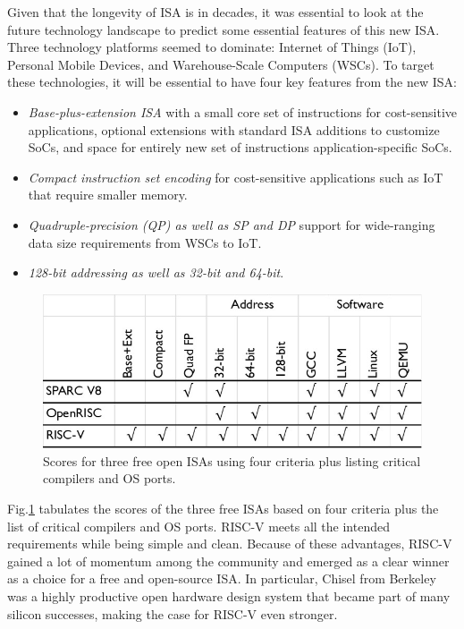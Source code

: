 \documentclass[journal]{IEEEtran}
\begin{document}
Given that the longevity of ISA is in decades, it was essential to look at the future technology landscape to predict some essential features of this new ISA. Three technology platforms seemed to dominate: Internet of Things (IoT), Personal Mobile Devices, and Warehouse-Scale Computers (WSCs). To target these technologies, it will be essential to have four key features from the new ISA:
\begin{itemize}
    \item \textit{Base-plus-extension ISA} with a small core set of instructions for cost-sensitive applications, optional extensions with standard ISA additions to customize SoCs, and space for entirely new set of instructions application-specific SoCs.
    \item \textit{Compact instruction set encoding} for cost-sensitive applications such as IoT that require smaller memory.
    \item \textit{Quadruple-precision (QP) as well as SP and DP} support for wide-ranging data size requirements from WSCs to IoT.
    \item \textit{128-bit addressing as well as 32-bit and 64-bit}.

\end{itemize}

\begin{figure}[htb]
    \centering
    \includegraphics[width=0.95\linewidth]{image-3FreeISA-Table.jpg}
    \caption{Scores for three free open ISAs using four criteria plus listing critical compilers and OS ports.}
    \label{fig:score}
\end{figure}

Fig.\ref{fig:score} tabulates the scores of the three free ISAs based on four criteria plus the list of critical compilers and OS ports. RISC-V meets all the intended requirements while being simple and clean. Because of these advantages, RISC-V gained a lot of momentum among the community and emerged as a clear winner as a choice for a free and open-source ISA. In particular, Chisel \cite{bachrach_chisel_2012} from Berkeley was a highly productive open hardware design system that became part of many silicon successes, making the case for RISC-V even stronger. 
\end{document}
